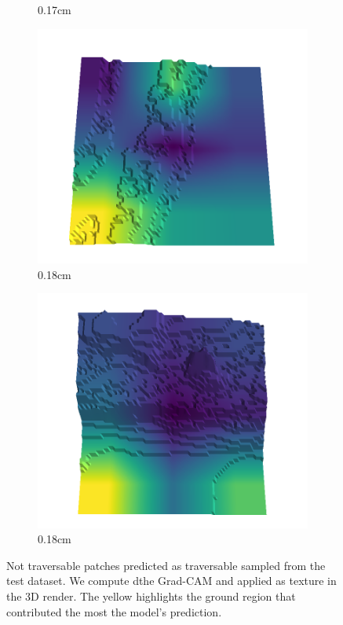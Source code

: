 \begin{figure}[H]
\begin{subfigure}[b]{0.192\linewidth}
    \caption{0.17cm}
    \label{fig : quarry-false_negative-18}
    \end{subfigure}
    \begin{subfigure}[b]{0.192\linewidth}
    \includegraphics[width=\linewidth]{../img/5/quarry/false_negative/17-patch-3d-majavi-colormap-180.png}
    \caption{0.18cm}
    \label{fig : quarry-false_negative-19}
    \end{subfigure}
    \begin{subfigure}[b]{0.192\linewidth}
    \includegraphics[width=\linewidth]{../img/5/quarry/false_negative/18-patch-3d-majavi-colormap-190.png}
    \caption{0.18cm}
    \label{fig : quarry-false_negative-20}
    \end{subfigure}
    \label{fig : quarry-false_negative}
    \caption{Not traversable patches predicted as traversable sampled from the test dataset. We compute dthe Grad-CAM and applied as texture in the 3D render. The yellow highlights the ground region that contributed the most the model's prediction. }
    \end{figure}

